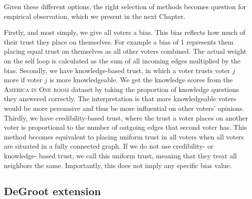 Given these different options, the right selection of methods becomes question
for empirical observation, which we present in the next Chapter.

Firstly, and most simply, we give all voters a bias. This bias reflects how
much of their trust they place on themselves. For example a bias of 1
represents them placing equal trust on themselves as all other voters combined.
The actual weight on the self loop is calculated as the sum of all incoming
edges multiplied by the bias. Secondly, we have knowledge-based trust, in which
a voter trusts voter $j$ more if voter $j$ is more knowledgeable. We get the
knowledge scores from the \textsc{America in One room} dataset by taking the
proportion of knowledge questions they answered correctly. The interpretation
is that more knowledgeable voters would be more persuasive and thus be more
influential on other voters' opinions. Thirdly, we have credibility-based
trust, where the trust a voter places on another voter is proportional to the
number of outgoing edges that second voter has. This method becomes equivalent
to placing uniform trust in all voters when all voters are situated in a fully
connected graph. If we do not use credibility- or knowledge- based trust, we
call this uniform trust, meaning that they treat all neighbors the same.
Importantly, this does not imply any specific bias value.



\subsection{DeGroot extension}

